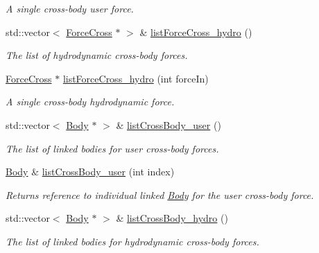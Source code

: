 \begin{DoxyCompactItemize}
\begin{DoxyCompactList}\small\item\em A single cross-\/body user force. \end{DoxyCompactList}\item 
std\-::vector$<$ \hyperlink{classosea_1_1ofreq_1_1_force_cross}{Force\-Cross} $\ast$ $>$ \& \hyperlink{classosea_1_1ofreq_1_1_body_a0dc70d3a67ad921a022f48a2fdf37526}{list\-Force\-Cross\-\_\-hydro} ()
\begin{DoxyCompactList}\small\item\em The list of hydrodynamic cross-\/body forces. \end{DoxyCompactList}\item 
\hyperlink{classosea_1_1ofreq_1_1_force_cross}{Force\-Cross} $\ast$ \hyperlink{classosea_1_1ofreq_1_1_body_ab814600b31abd49c0a8de29a0fb597b4}{list\-Force\-Cross\-\_\-hydro} (int force\-In)
\begin{DoxyCompactList}\small\item\em A single cross-\/body hydrodynamic force. \end{DoxyCompactList}\item 
std\-::vector$<$ \hyperlink{classosea_1_1ofreq_1_1_body}{Body} $\ast$ $>$ \& \hyperlink{classosea_1_1ofreq_1_1_body_a56ad2b60555f24df3feb5889974b27b2}{list\-Cross\-Body\-\_\-user} ()
\begin{DoxyCompactList}\small\item\em The list of linked bodies for user cross-\/body forces. \end{DoxyCompactList}\item 
\hyperlink{classosea_1_1ofreq_1_1_body}{Body} \& \hyperlink{classosea_1_1ofreq_1_1_body_afaf64ab1b477ff157f31e6824be1b767}{list\-Cross\-Body\-\_\-user} (int index)
\begin{DoxyCompactList}\small\item\em Returns reference to individual linked \hyperlink{classosea_1_1ofreq_1_1_body}{Body} for the user cross-\/body force. \end{DoxyCompactList}\item 
std\-::vector$<$ \hyperlink{classosea_1_1ofreq_1_1_body}{Body} $\ast$ $>$ \& \hyperlink{classosea_1_1ofreq_1_1_body_a7c930213d83962d4248068c38c589113}{list\-Cross\-Body\-\_\-hydro} ()
\begin{DoxyCompactList}\small\item\em The list of linked bodies for hydrodynamic cross-\/body forces. \end{DoxyCompactList}\item 

\end{DoxyCompactItemize}
